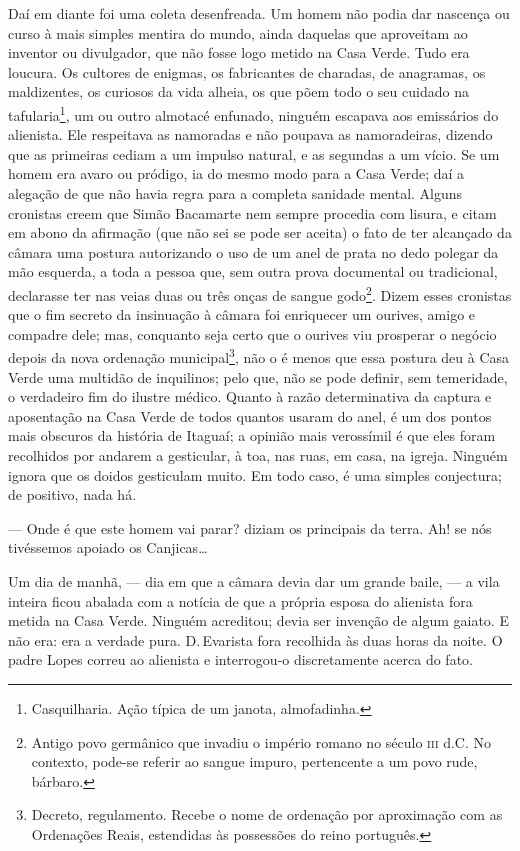 Daí em diante foi uma coleta desenfreada. Um homem não podia dar
nascença ou curso à mais simples mentira do mundo, ainda daquelas que
aproveitam ao inventor ou divulgador, que não fosse logo metido na Casa
Verde. Tudo era loucura. Os cultores de enigmas, os fabricantes de
charadas, de anagramas, os maldizentes, os curiosos da vida alheia, os
que põem todo o seu cuidado na tafularia\footnote{Casquilharia. Ação
  típica de um janota, almofadinha.}, um ou outro almotacé enfunado,
ninguém escapava aos emissários do alienista. Ele respeitava as
namoradas e não poupava as namoradeiras, dizendo que as primeiras cediam
a um impulso natural, e as segundas a um vício. Se um homem era avaro ou
pródigo, ia do mesmo modo para a Casa Verde; daí a alegação de que não
havia regra para a completa sanidade mental. Alguns cronistas creem que
Simão Bacamarte nem sempre procedia com lisura, e citam em abono da
afirmação (que não sei se pode ser aceita) o fato de ter alcançado da
câmara uma postura autorizando o uso de um anel de prata no dedo polegar
da mão esquerda, a toda a pessoa que, sem outra prova documental ou
tradicional, declarasse ter nas veias duas ou três onças de sangue
godo\footnote{Antigo povo germânico que invadiu o império romano no
  século \textsc{iii} d.C. No contexto, pode-se referir ao sangue impuro,
  pertencente a um povo rude, bárbaro.}. Dizem esses cronistas que o fim
secreto da insinuação à câmara foi enriquecer um ourives, amigo e
compadre dele; mas, conquanto seja certo que o ourives viu prosperar o
negócio depois da nova ordenação municipal\footnote{Decreto,
  regulamento. Recebe o nome de ordenação por aproximação com as
  Ordenações Reais, estendidas às possessões do reino português.}, não o
é menos que essa postura deu à Casa Verde uma multidão de inquilinos;
pelo que, não se pode definir, sem temeridade, o verdadeiro fim do
ilustre médico. Quanto à razão determinativa da captura e aposentação na
Casa Verde de todos quantos usaram do anel, é um dos pontos mais
obscuros da história de Itaguaí; a opinião mais verossímil é que eles
foram recolhidos por andarem a gesticular, à toa, nas ruas, em casa, na
igreja. Ninguém ignora que os doidos gesticulam muito. Em todo caso, é
uma simples conjectura; de positivo, nada há.

--- Onde é que este homem vai parar? diziam os principais da terra. Ah!
se nós tivéssemos apoiado os Canjicas\ldots{}

Um dia de manhã, --- dia em que a câmara devia dar um grande baile, ---
a vila inteira ficou abalada com a notícia de que a própria esposa do
alienista fora metida na Casa Verde. Ninguém acreditou; devia ser
invenção de algum gaiato. E não era: era a verdade pura. D.\,Evarista
fora recolhida às duas horas da noite. O padre Lopes correu ao alienista
e interrogou-o discretamente acerca do fato.

